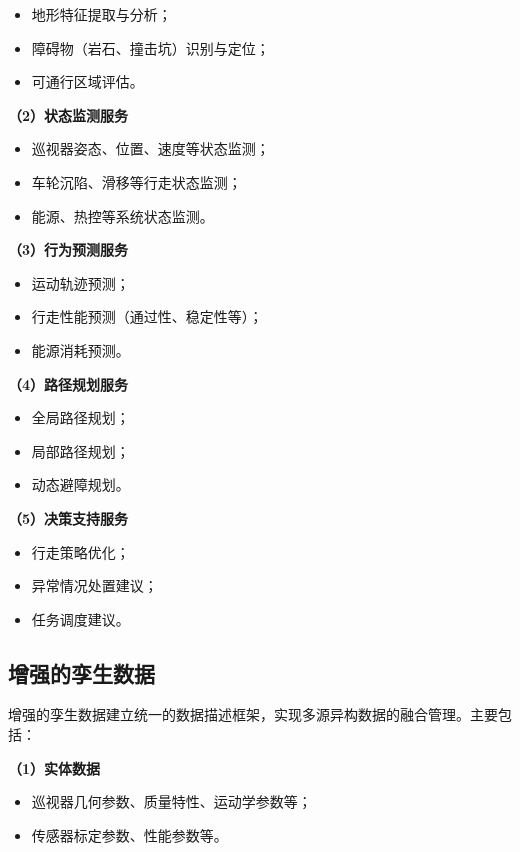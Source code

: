 \begin{itemize}
    \item 地形特征提取与分析；
    \item 障碍物（岩石、撞击坑）识别与定位；
    \item 可通行区域评估。
\end{itemize}

\textbf{（2）状态监测服务}

\begin{itemize}
    \item 巡视器姿态、位置、速度等状态监测；
    \item 车轮沉陷、滑移等行走状态监测；
    \item 能源、热控等系统状态监测。
\end{itemize}

\textbf{（3）行为预测服务}

\begin{itemize}
    \item 运动轨迹预测；
    \item 行走性能预测（通过性、稳定性等）；
    \item 能源消耗预测。
\end{itemize}

\textbf{（4）路径规划服务}

\begin{itemize}
    \item 全局路径规划；
    \item 局部路径规划；
    \item 动态避障规划。
\end{itemize}

\textbf{（5）决策支持服务}

\begin{itemize}
    \item 行走策略优化；
    \item 异常情况处置建议；
    \item 任务调度建议。
\end{itemize}

\subsection{增强的孪生数据}
\label{subsec:enhanced_data}

增强的孪生数据建立统一的数据描述框架，实现多源异构数据的融合管理。主要包括：

\textbf{（1）实体数据}

\begin{itemize}
    \item 巡视器几何参数、质量特性、运动学参数等；
    \item 传感器标定参数、性能参数等。
\end{itemize}

